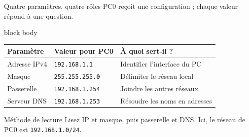 \documentclass[aspectratio=169,11pt]{beamer}
\newenvironment{schema}{%
  \begin{beamercolorbox}[sep=8pt,rounded=true]{block body}
  \centering\begin{tikzpicture}[>=Stealth]
}{\end{tikzpicture}\end{beamercolorbox}}
\begin{document}
\begin{frame}{Quatre paramètres, quatre rôles}
  PC0 reçoit une configuration ; chaque valeur répond à une question.
  \renewcommand{\arraystretch}{1.5}
  \begin{beamercolorbox}[sep=9pt]{block body}
  \centering\small
  \begin{tabular}{lll}
    \textbf{Paramètre} & \textbf{Valeur pour PC0} & \textbf{À quoi sert-il ?}\\\hline
    Adresse IPv4 & \texttt{192.168.1.1} & Identifier l'interface du PC\\
    Masque & \texttt{255.255.255.0} & Délimiter le réseau local\\
    Passerelle & \texttt{192.168.1.254} & Joindre les autres réseaux\\
    Serveur DNS & \texttt{192.168.1.253} & Résoudre les noms en adresses\\
  \end{tabular}
  \end{beamercolorbox}
  \begin{block}{Méthode de lecture}
    Lisez IP et masque, puis passerelle et DNS.
    Ici, le réseau de PC0 est \texttt{192.168.1.0/24}.
  \end{block}
\end{frame}



\end{document}
